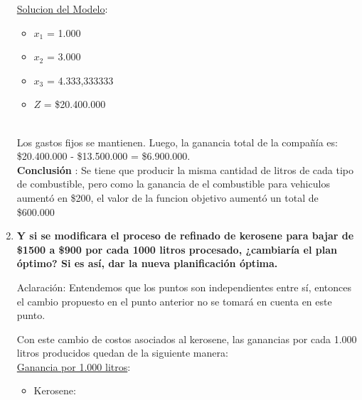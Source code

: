 \documentclass[10pt,a4paper]{article}
\begin{document}
\begin{enumerate}[label=\textbf{\sffamily\large\arabic*.}]
\begin{itemize}
    \end{itemize}

    \underline{Solucion del Modelo}: 

    \begin{itemize}

        \item $x_{1}$ = 1.000
        \item $x_{2}$ = 3.000
        \item $x_{3}$ = 4.333,333333
        \item $Z$ = \$20.400.000\\

    \end{itemize}
    \\
    Los gastos fijos se mantienen. 
    Luego, la ganancia total de la compañía es: \$20.400.000 - \$13.500.000 = \$6.900.000. \\
    
    

    \textbf{Conclusión }:
    \vspace{0,5em}
    Se tiene que producir la misma cantidad de litros de cada tipo de combustible, pero como la ganancia de el combustible para vehiculos aumentó en \$200, el valor de la funcion objetivo aumentó un total de \$600.000 \\
    

    
    

    \item {\bfseries\large Y si se modificara el proceso de refinado de kerosene para bajar de \$1500 a \$900 por cada 1000 litros procesado,
    ¿cambiaría el plan óptimo? Si es así, dar la nueva planificación óptima.}
    \vspace{1em}

    Aclaración: Entendemos que los puntos son independientes entre sí, entonces el cambio propuesto en el punto anterior no se tomará en cuenta en este punto.

    \vspace{1em}


     Con este cambio de costos asociados al kerosene, las ganancias por cada 1.000 litros producidos quedan de la siguiente manera:\\

    \underline{Ganancia por 1.000 litros}:
    \begin{itemize}
    \item Kerosene:
        \begin{itemize}


\end{itemize}
\end{itemize}
\end{enumerate}
\end{document}
